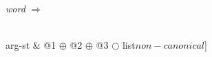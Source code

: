 \documentclass{standalone}
\begin{document}
\textit{word} $\Rightarrow$
 \begin{avm}
[valence  & [subj & @1\\
						spr & @2\\
						comps & @3]\\
 arg-st & @1 $\oplus$ @2 $\oplus$ @3 $\bigcirc$ list\(non-canonical\)] 
\end{avm}
\end{document}
